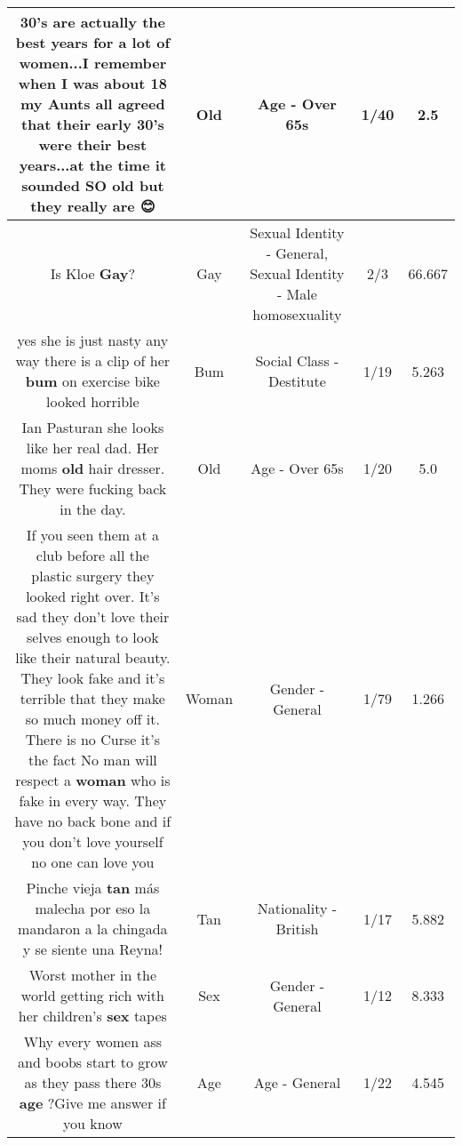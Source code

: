 \documentclass[11pt]{article}
\newlength\mylength
\begin{document}
\begin{center}
\begin{longtable}{|C{.65\mylength}|C{.30\mylength}|C{.12\mylength}|C{.12\mylength}|C{.12\mylength}|}
  \small 30's are actually the best years for a lot of women...I remember when I was about 18 my Aunts all agreed that their early 30's were their best years...at the time it sounded SO \textbf{old} but they really are 😊\normalsize   & Old & Age - Over 65s & 1/40 & 2.5 \\  \hline
  \small Is Kloe \textbf{G\textbf{ay}}?\normalsize   & Gay & Sexual Identity - General, Sexual Identity - Male homosexuality & 2/3 & 66.667 \\  \hline
  \small yes she is just nasty any way there is a clip of her \textbf{bum} on exercise bike looked horrible\normalsize   & Bum & Social Class - Destitute & 1/19 & 5.263 \\  \hline
  \small Ian Pasturan she looks like her real dad. Her moms \textbf{old} hair dresser. They were fucking back in the day.\normalsize   & Old & Age - Over 65s & 1/20 & 5.0 \\  \hline
  \small If you seen them at a club before all the plastic surgery they looked right over. It's sad they don't love their selves enough to look like their natural beauty. They look fake and it's terrible that they make so much money off it. There is no Curse it's the fact No man will respect a \textbf{woman} who is fake in every way. They have no back bone and if you don't love yourself no one can love you\normalsize   & Woman & Gender - General & 1/79 & 1.266 \\  \hline
  \small Pinche vieja \textbf{tan} más malecha por eso la mandaron a la chingada y se siente una Reyna!\normalsize   & Tan & Nationality - British & 1/17 & 5.882 \\  \hline
  \small Worst mother in the world getting rich with her children's \textbf{sex} tapes\normalsize   & Sex & Gender - General & 1/12 & 8.333 \\  \hline
  \small Why every women ass and boobs start to grow as they pass there 30s \textbf{age} ?Give me answer if you know\normalsize   & Age & Age - General & 1/22 & 4.545 \\  \hline

\end{longtable}
\end{center}
\end{document}
